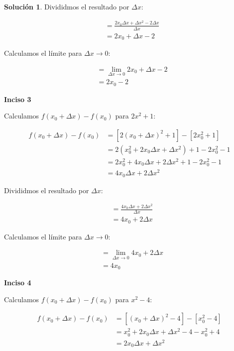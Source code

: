 \documentclass{article}
\theoremstyle{definition}
\newtheorem*{solution}{Solución}
\begin{document}
\begin{solution}
Divididmos el resultado por \( \Delta x \):

    \begin{align*}
    &= \frac{2x_0\Delta x + \Delta x^2 - 2 \Delta x}{\Delta x} \\
    &= 2x_0 + \Delta x - 2
    \end{align*}

Calculamos el límite para \( \Delta x \to 0 \):

    \begin{align*}
        &= \lim_{\Delta x \to 0} 2x_0 + \Delta x - 2 \\
        &= 2x_0 - 2
    \end{align*}

\textbf{Inciso 3}

Calculamos \( f(x_0+\Delta x)-f(x_0)\) para \( 2x^2 + 1 \):

    \begin{align*}
    f(x_0+\Delta x)-f(x_0) &= [2(x_0+\Delta x)^2+1]-[2x_0^2+1] \\
    &= 2(x_0^2 + 2x_0\Delta x + \Delta x^2) +1 - 2x_0^2 - 1 \\
    &= 2x_0^2 + 4x_0 \Delta x + 2 \Delta x^2 + 1 - 2x_0^2 - 1 \\
    &= 4x_0 \Delta x + 2 \Delta x^2
    \end{align*}

Divididmos el resultado por \( \Delta x \):

    \begin{align*}
    &= \frac{4x_0 \Delta x + 2 \Delta x^2}{\Delta x} \\
    &= 4x_0 + 2\Delta x
    \end{align*}

Calculamos el límite para \( \Delta x \to 0 \):

    \begin{align*}
        &= \lim_{\Delta x \to 0} 4x_0 + 2\Delta x \\
        &= 4x_0
    \end{align*}

\textbf{Inciso 4}

Calculamos \( f(x_0+\Delta x)-f(x_0)\) para \( x^2 -4 \):

    \begin{align*}
    f(x_0+\Delta x)-f(x_0) &= [(x_0+\Delta x)^2-4]-[x_0^2-4] \\
    &= x_0^2 + 2x_0\Delta x + \Delta x^2 -4 - x_0^2 + 4 \\
    &= 2x_0 \Delta x + \Delta x^2
    \end{align*}


\end{solution}
\end{document}
